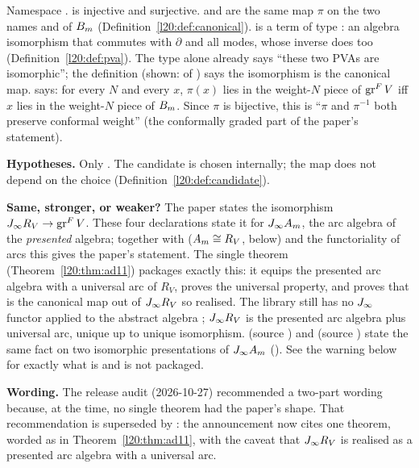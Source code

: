 \begin{dictionary}
Namespace .  is injective and
surjective.  and  are the
same map $\pi$ on the two names  and  of $B_m$
(Definition~\ref{l20:def:canonical}).  is a term of type
: an algebra isomorphism
that commutes with $\partial$ and all modes, whose inverse does too (Definition~\ref{l20:def:pva}). The type
alone already says ``these two PVAs are isomorphic''; the definition (shown:  of
) says the isomorphism is the canonical map.  says:
for every $N$ and every $x$, $\pi(x)$ lies in the weight-$N$ piece of $\operatorname{gr}^F V$ iff $x$ lies in the weight-$N$
piece of $B_m$. Since $\pi$ is bijective, this is ``$\pi$ and $\pi^{-1}$ both preserve conformal weight''
(the conformally graded part of the paper's statement).

\textbf{Hypotheses.} Only . The candidate is chosen internally; the map does not depend on
the choice (Definition~\ref{l20:def:candidate}).

\textbf{Same, stronger, or weaker?} The paper states the isomorphism $J_\infty R_V\to\operatorname{gr}^F V$. These four
declarations state it for $J_\infty A_m$, the arc algebra of the \emph{presented} algebra; together with
 ($A_m\cong R_V$, below) and the functoriality of arcs this gives the paper's statement. The
single theorem  (Theorem~\ref{l20:thm:ad11}) packages exactly this: it equips the presented
arc algebra with a universal arc of $R_V$, proves the universal property, and proves that  is the
canonical map out of $J_\infty R_V$ so realised. The library still has no $J_\infty$ functor applied to the abstract
algebra ; $J_\infty R_V$ is the presented arc algebra plus universal arc, unique up to unique isomorphism.
 (source )
and  (source ) state the same fact on two isomorphic
presentations of $J_\infty A_m$ (). See the warning below for exactly what is and is
not packaged.

\textbf{Wording.} The release audit (2026-10-27) recommended a two-part wording because, at the time, no single theorem had
the paper's shape. That recommendation is superseded by : the announcement now cites one
theorem, worded as in Theorem~\ref{l20:thm:ad11}, with the caveat that $J_\infty R_V$ is realised as a presented arc
algebra with a universal arc.
\end{dictionary}

